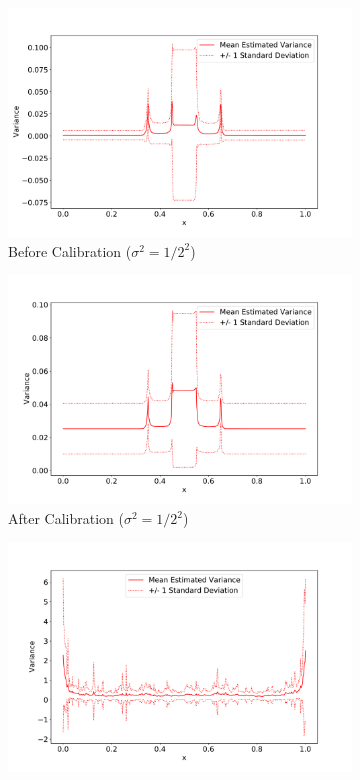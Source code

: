 \documentclass[11pt]{article}
\begin{document}
\begin{figure}[htbp]
	\centering
	\begin{subfigure}[b]{0.48\textwidth}
		\centering
		\includegraphics[width=\textwidth]{../figures/Before_Calibration.pdf}
		\caption{Before Calibration ($\sigma^2 = 1/2^2$)}
		\label{fig:Before_Calibration}
	\end{subfigure}
	\hfill
	\begin{subfigure}[b]{0.48\textwidth}
		\centering
		\includegraphics[width=\textwidth]{../figures/Calibration.pdf}
		\caption{After Calibration ($\sigma^2 = 1/2^2$)}
		\label{fig:Calibration}
	\end{subfigure}
	\hfill
	\begin{subfigure}[b]{0.48\textwidth}
		\centering
		\includegraphics[width=\textwidth]{../figures/Before_Calibration_2.pdf}

\end{subfigure}
\end{figure}
\end{document}

